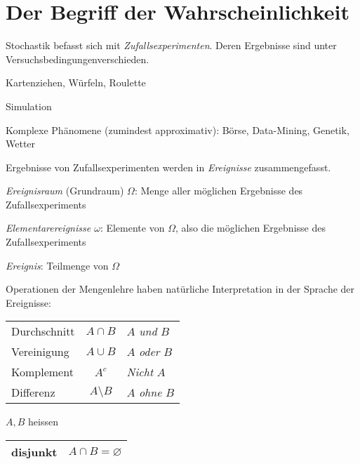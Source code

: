 \chapter{Der Begriff der Wahrscheinlichkeit}
\label{kap1}
Stochastik befasst sich mit \emph{Zufallsexperimenten}. Deren Ergebnisse sind unter \glqq Versuchsbedingungen\grqq verschieden.
\begin{bspl}
	\begin{compactitem}
		\item Kartenziehen, Würfeln, Roulette
		\item Simulation
		\item Komplexe Phänomene (zumindest approximativ): Börse, Data-Mining, Genetik, Wetter
	\end{compactitem}
\end{bspl}
Ergebnisse von Zufallsexperimenten werden in \emph{Ereignisse} zusammengefasst.
\begin{compactitem}
	\item \emph{Ereignisraum} (Grundraum) $\Omega$: Menge aller möglichen Ergebnisse des Zufallsexperiments
	\item \emph{Elementarereignisse $\omega$}: Elemente von $\Omega$, also die möglichen Ergebnisse des Zufallsexperiments
	\item \emph{Ereignis}: Teilmenge von $\Omega$
	\item Operationen der Mengenlehre haben natürliche Interpretation in der Sprache der Ereignisse:\\[-1em]
		\begin{center}
				\begin{tabular}{lcl}
					\toprule
					Durchschnitt	& $A\cap B$			& $A$ \emph{und} $B$	\\
					Vereinigung		& $A\cup B$			& $A$ \emph{oder} $B$	\\
					Komplement		& $A^c$				& \emph{Nicht} $A$	\\
					Differenz		& $A\setminus B$	& $A$ \emph{ohne} $B$ \\
					\bottomrule
				\end{tabular}
		\end{center}
		$A,B$ heissen
		\begin{center}
				\begin{tabular}{lr}
					\toprule
					disjunkt	& $A\cap B=\varnothing$			\\
					\bottomrule
				\end{tabular}
		\end{center}
\end{compactitem}

